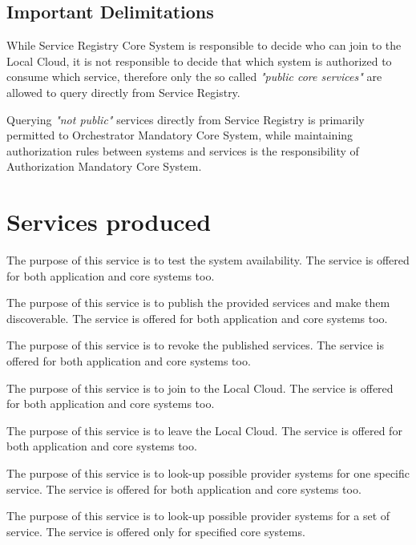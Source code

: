 \documentclass[a4paper]{arrowhead}
\begin{document}
\subsection{Important Delimitations}
\label{sec:delimitations}

While Service Registry Core System is responsible to decide who can join to the Local Cloud, it is not responsible to decide that which system is authorized to consume which service, therefore only the so called \textit{"public core services"} are allowed to query directly from Service Registry.

Querying \textit{"not public"} services directly from Service Registry is primarily permitted to Orchestrator Mandatory Core System, while maintaining authorization rules between systems and services is the responsibility of Authorization Mandatory Core System.

\newpage

\section{Services produced}
\label{sec:services}

The purpose of this service is to test the system availability. The service is offered for both application and core systems too. 

The purpose of this service is to publish the provided services and make them discoverable. The service is offered for both application and core systems too. 

The purpose of this service is to revoke the published services. The service is offered for both application and core systems too. 

The purpose of this service is to join to the Local Cloud. The service is offered for both application and core systems too.

The purpose of this service is to leave the Local Cloud. The service is offered for both application and core systems too.

The purpose of this service is to look-up possible provider systems for one specific service. The service is offered for both application and core systems too.

The purpose of this service is to look-up possible provider systems for a set of service. The service is offered only for specified core systems.
\end{document}
